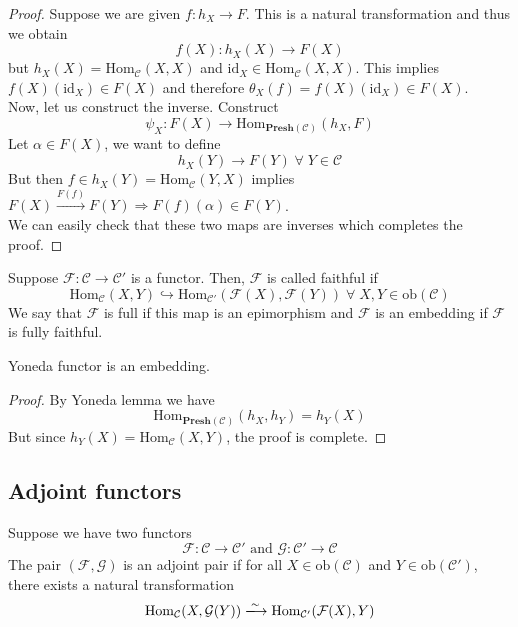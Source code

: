 \documentclass[oneside, 12pt, ]{scrbook}
\theoremstyle{theorem}
\begin{document}
\begin{proof}
Suppose we are given $f: h_{X} \rightarrow F$. This is a natural transformation and thus we obtain $$f(X): h_{X}(X) \rightarrow F(X)$$ but $h_{X}(X) = \mathrm{Hom}_{\mathcal{C}}(X,X)$ and $\mathrm{id}_{X} \in \mathrm{Hom}_{\mathcal{C}}(X,X)$. This implies $f(X)(\mathrm{id}_{X}) \in F(X)$ and therefore $\theta_{X}(f) = f(X)(\mathrm{id}_{X}) \in F(X)$. \\
Now, let us construct the inverse. Construct $$\psi_{X} : F(X) \rightarrow \mathrm{Hom}_{\mathbf{Presh}(\mathcal{C})}(h_{X}, F)$$ Let $\alpha \in F(X)$, we want to define $$h_{X}(Y) \rightarrow F(Y) \; \forall \; Y \in \mathcal{C}$$ But then $f \in h_{X}(Y)=\mathrm{Hom}_{\mathcal{C}}(Y,X)$ implies $F(X) \xrightarrow{F(f)} F(Y) \Rightarrow F(f)(\alpha) \in F(Y)$. \\
We can easily check that these two maps are inverses which completes the proof.
\end{proof}

Suppose $\mathcal{F}: \mathcal{C} \rightarrow \mathcal{C}'$ is a functor. Then, $\mathcal{F}$ is called faithful if $$\mathrm{Hom}_{\mathcal{C}}(X,Y) \hookrightarrow \mathrm{Hom}_{\mathcal{C}'} (\mathcal{F}(X), \mathcal{F}(Y)) \; \forall \; X,Y \in \mathrm{ob}(\mathcal{C})$$
We say that $\mathcal{F}$ is full if this map is an epimorphism and $\mathcal{F}$ is an embedding if $\mathcal{F}$ is fully faithful.

\begin{lemma}
Yoneda functor is an embedding.
\end{lemma}

\begin{proof}
By Yoneda lemma we have $$\mathrm{Hom}_{\mathbf{Presh}(\mathcal{C})}(h_{X}, h_{Y}) = h_{Y}(X)$$ But since $h_{Y}(X) = \mathrm{Hom}_{\mathcal{C}}(X,Y)$, the proof is complete.
\end{proof}

\subsection{Adjoint functors}

Suppose we have two functors $$\mathcal{F}: \mathcal{C} \rightarrow \mathcal{C}'  \text{ and } \mathcal{G}: \mathcal{C}' \rightarrow \mathcal{C}$$
The pair $(\mathcal{F}, \mathcal{G})$ is an adjoint pair if for all $X \in \mathrm{ob}(\mathcal{C})$ and $Y \in \mathrm{ob}(\mathcal{C}')$, there exists a natural transformation $$\mathrm{Hom}_{\mathcal{C}}(X, \mathcal{G}(Y)) \xlongrightarrow{\sim} \mathrm{Hom}_{\mathcal{C}'}(\mathcal{F}(X),Y)$$
\end{document}
